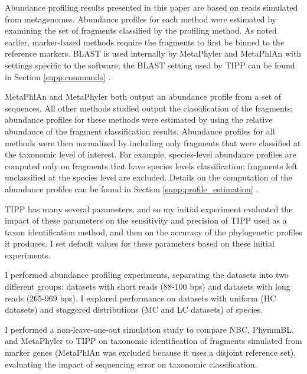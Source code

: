 Abundance profiling results presented in this paper are based on reads simulated from 
metagenomes.  Abundance profiles for each method were estimated by examining the set of fragments classified by the profiling method.  
As noted earlier, marker-based methods require the 
fragments to first be binned to the reference markers.  
BLAST is used internally by MetaPhyler and MetaPhlAn with 
settings specific to the software; the BLAST setting used by TIPP can be found in Section \ref{supp:commands}
.

MetaPhlAn and MetaPhyler both output an abundance profile from a set of sequences.  All other methods studied output the classification of the fragments; abundance profiles for these methods were estimated by using the relative abundance of the fragment classification results.  Abundance profiles for all methods were then normalized by including only fragments that were classified at the taxonomic level of interest.  For example, species-level abundance profiles are computed only on fragments that have species levels classification; fragments left unclassified at the species level are excluded.  Details on the computation of the abundance profiles can be found in Section \ref{supp:profile_estimation}
.

TIPP has many several parameters, and so my initial experiment
evaluated the impact of these parameters on the sensitivity and
precision of 
TIPP used as a taxon identification method, and then on the
accuracy of the phylogenetic profiles it produces. I set
default values for these parameters based on these initial experiments.

I performed abundance profiling experiments, separating the datasets into two different groups: datasets with short reads (88-100 bps) and datasets with long reads (265-969 bps).  
I explored performance on  datasets with uniform (HC datasets) and staggered distributions (MC and LC datasets) of species.  

I performed a non-leave-one-out simulation study 
to compare NBC, PhymmBL, and MetaPhyler to TIPP on taxonomic identification of fragments simulated from marker genes (MetaPhlAn was excluded because it uses a disjoint reference set), evaluating the
impact of sequencing error on taxonomic classification.

